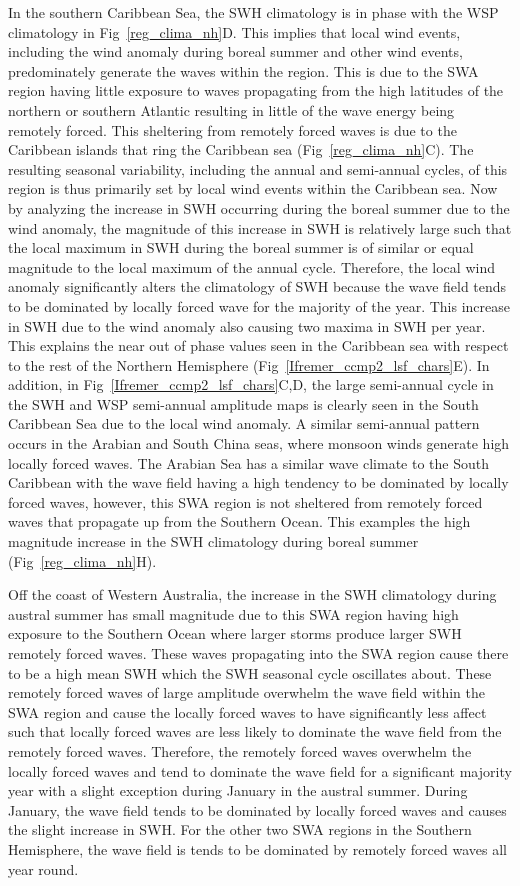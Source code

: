\documentclass[draft,linenumbers]{agujournal2018}
\begin{document}
In the southern Caribbean Sea, the SWH climatology is in phase with the WSP climatology in Fig~\ref{reg_clima_nh}D. This implies that local wind events, including the wind anomaly during boreal summer and other wind events, predominately generate the waves within the region. This is due to the SWA region having little exposure to waves propagating from the high latitudes of the northern or southern Atlantic resulting in little of the wave energy being remotely forced. This sheltering from remotely forced waves is due to the Caribbean islands that ring the Caribbean sea (Fig~\ref{reg_clima_nh}C). The resulting seasonal variability, including the annual and semi-annual cycles, of this region is thus primarily set by local wind events within the Caribbean sea. Now by analyzing the increase in SWH occurring during the boreal summer due to the wind anomaly, the magnitude of this increase in SWH is relatively large such that the local maximum in SWH during the boreal summer is of similar or equal magnitude to the local maximum of the annual cycle. Therefore, the local wind anomaly significantly alters the climatology of SWH because the wave field tends to be dominated by locally forced wave for the majority of the year. This increase in SWH due to the wind anomaly also causing two maxima in SWH per year. This explains the near out of phase values seen in the Caribbean sea with respect to the rest of the Northern Hemisphere (Fig~\ref{Ifremer_ccmp2_lsf_chars}E). In addition, in Fig~\ref{Ifremer_ccmp2_lsf_chars}C,D, the large semi-annual cycle in the SWH and WSP semi-annual amplitude maps is clearly seen in the South Caribbean Sea due to the local wind anomaly. A similar semi-annual pattern occurs in the Arabian and South China seas, where monsoon winds generate high locally forced waves. The Arabian Sea has a similar wave climate to the South Caribbean with the wave field having a high tendency to be dominated by locally forced waves, however, this SWA region is not sheltered from remotely forced waves that propagate up from the Southern Ocean. This examples the high magnitude increase in the SWH climatology during boreal summer (Fig~\ref{reg_clima_nh}H). 

Off the coast of Western Australia, the increase in the SWH climatology during austral summer has small magnitude due to this SWA region having high exposure to the Southern Ocean where larger storms produce larger SWH remotely forced waves. These waves propagating into the SWA region cause there to be a high mean SWH which the SWH seasonal cycle oscillates about. These remotely forced waves of large amplitude overwhelm the wave field within the SWA region and cause the locally forced waves to have significantly less affect such that locally forced waves are less likely to dominate the wave field from the remotely forced waves. Therefore, the remotely forced waves overwhelm the locally forced waves and tend to dominate the wave field for a significant majority year with a slight exception during January in the austral summer. During January, the wave field tends to be dominated by locally forced waves and causes the slight increase in SWH. For the other two SWA regions in the Southern Hemisphere, the wave field is tends to be dominated by remotely forced waves all year round.  
\end{document}
